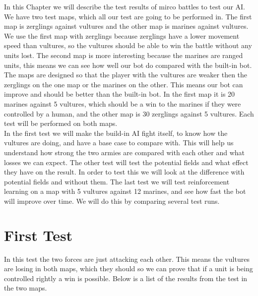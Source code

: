 In this Chapter we will describe the test results of mirco battles to test our AI. We have two test maps, which all our test are going to be performed in. The first map is  zerglings against vultures and the other map is marines against vultures. We use the first map with zerglings because zerglings have a lower movement speed than vultures, so the vultures should be able to win the battle without any units lost. The second map is more interesting because the marines are ranged units, this means we can see how well our bot do compared with the built-in bot. The maps are  designed so that the player with the vultures are weaker then the zerglings on the one map or the marines on the other. This means our bot can improve and should be better than the built-in bot. In the first map it is 20 marines against 5 vultures, which should be a win to the marines if they were controlled by a human, and the other map is 30 zerglings against 5 vultures. Each test will be performed on both maps. \\


In the first test we will make the build-in AI fight itself, to know how the vultures are doing, and have a base case to compare with. This will help us understand how strong the two armies are compared with each other and what losses we can expect. The other test will test the potential fields and what effect they have on the result.
In order to test this we will look at the difference with potential fields and without them. The last test we will test reinforcement learning on a map with 5 vultures against 12 marines, and see how fast the bot will improve over time. We will do this by comparing several test runs.

\section{First Test} %
In this test the two forces are just attacking each other. This means the vultures are losing in both maps, which they should so we can prove that if a unit is being controlled rightly a win is possible. Below is a list of the results from the test
in the two maps.\\

